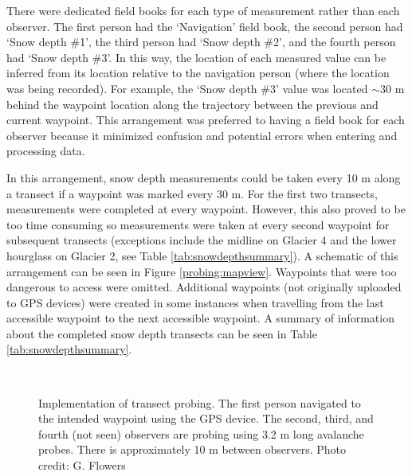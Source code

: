 \documentclass{sfuthesis}
\begin{document}
There were dedicated field books for each type of measurement rather than each observer. The first person had the `Navigation' field book, the second person had `Snow depth \#1', the third person had `Snow depth \#2', and the fourth person had `Snow depth \#3'. In this way, the location of each measured value can be inferred from its location relative to the navigation person (where the location was being recorded). For example, the `Snow depth \#3' value was located $\sim$30 m behind the waypoint location along the trajectory between the previous and current waypoint. This arrangement was preferred to having a field book for each observer because it minimized confusion and potential errors when entering and processing data.

In this arrangement, snow depth measurements could be taken every 10 m along a transect if a waypoint was marked every 30 m. For the first two transects, measurements were completed at every waypoint. However, this also proved to be too time consuming so measurements were taken at every second waypoint for subsequent transects (exceptions include the midline on Glacier 4 and the lower hourglass on Glacier 2, see Table \ref{tab:snowdepthsummary}). A schematic of this arrangement can be seen in Figure \ref{probing:mapview}. Waypoints that were too dangerous to access were omitted. Additional waypoints (not originally uploaded to GPS devices) were created in some instances when travelling from the last accessible waypoint to the next accessible waypoint. A summary of information about the completed snow depth transects can be seen in Table \ref{tab:snowdepthsummary}.

\begin{figure}
	\centering
	\\
	\caption{Implementation of transect probing. The first person navigated to the intended waypoint using the GPS device. The second, third, and fourth (not seen) observers are probing using 3.2 m long avalanche probes. There is approximately 10 m between observers. Photo credit: G. Flowers}
	\label{photo_probing}
	\end{figure}
\end{document}
